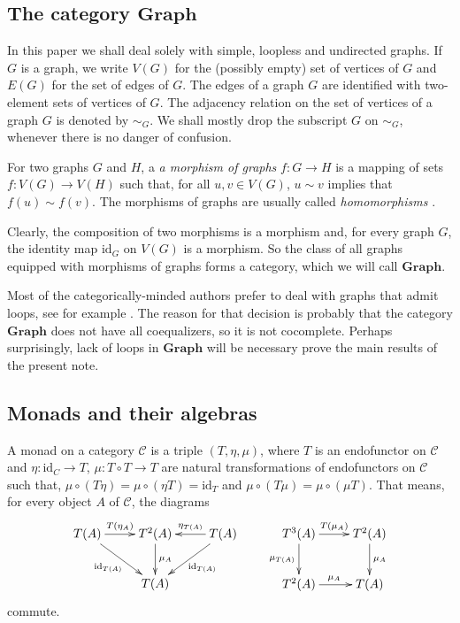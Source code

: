 \documentclass[reqno,A4paper]{amsart}
\newcommand{\id}{\mathrm{id}}
\newcommand{\C}{\mathcal{C}}
\newcommand{\Graph}{\mathbf{Graph}}
\theoremstyle{definition}
\numberwithin{equation}{section}
\begin{document}
\subsection{The category $\Graph$}

In this paper we shall deal solely with simple, loopless and undirected graphs. 
If $G$ is a graph, we write $V(G)$ for the (possibly empty) set of vertices of
$G$ and $E(G)$ for the set of edges of $G$. The edges of a graph $G$ are identified with
two-element sets of vertices of $G$.
The adjacency relation on the set of vertices of a graph $G$ is denoted by $\sim_G$. 
We shall mostly drop the subscript $G$ on $\sim_G$,
whenever there is no danger of confusion.

For two graphs $G$ and $H$, a {\em a morphism of graphs} $f:G\to H$ 
is a mapping of sets $f:V(G)\to V(H)$ such that, for all 
$u,v\in V(G)$, $u\sim v$ implies that $f(u)\sim f(v)$. The morphisms of
graphs are usually called {\em homomorphisms} \cite{hahn1997graph}.

Clearly, the composition of two morphisms is a morphism and, for every graph
$G$, the identity map $\id_G$ on $V(G)$ is a morphism. So the class of all
graphs equipped with morphisms of graphs forms a category, which we will call
$\Graph$.

Most of the categorically-minded authors prefer to deal with graphs
that admit loops, see for example \cite{brown2008graphs}. The reason
for that decision is probably that the category $\Graph$ does not have all coequalizers,
so it is not cocomplete.
Perhaps surprisingly, lack of loops in $\Graph$ will be necessary prove the
main results of the present note.

\subsection{Monads and their algebras}

A monad on a category $\C$ is a triple $(T,\eta,\mu)$,
where $T$ is an endofunctor on $\C$ and $\eta:\id_C\to T$, $\mu:T\circ T\to T$
are natural transformations of endofunctors on $\C$ such that,
$\mu\circ(T\eta)=\mu\circ(\eta T)=\id_T$ and $\mu\circ(T\mu)=\mu\circ(\mu T)$.
That means, for every object $A$ of $\C$, the diagrams
\begin{equation}
\label{diag:monad}
\xymatrix{
T(A)
	\ar[r]^-{T(\eta_A)}
	\ar[rd]_-{\id_{T(A)}}
&
T^2(A)
	\ar[d]^-{\mu_A}
&
T(A)
	\ar[l]_-{\eta_{T(A)}}
	\ar[ld]^-{\id_{T(A)}}
\\
~
&
T(A)
}
\qquad
\xymatrix{
T^3(A)
	\ar[r]^{T(\mu_A)}
	\ar[d]_{\mu_{T(A)}}
&
T^2(A)
	\ar[d]^{\mu_A}
\\
T^2(A)
	\ar[r]^{\mu_A}
&
T(A)
}
\end{equation}
commute.
\end{document}
